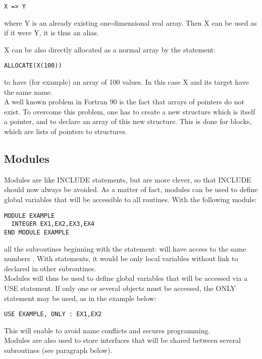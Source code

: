 \begin{lstlisting}[language=TelFortran]
X => Y
\end{lstlisting}
where Y is an already existing one-dimensional real array. Then X can be used as
if it were Y, it is thus an alias.

X can be also directly allocated as a normal array by the statement:
\begin{lstlisting}[language=TelFortran]
ALLOCATE(X(100))
\end{lstlisting}
to have (for example) an array of 100 values. In this case X and its target
have the same name.
\\
A well known problem in Fortran 90 is the fact that arrays of pointers do not
exist. To overcome this problem, one has to create a new structure which is
itself a pointer, and to declare an array of this new structure. This is done
for blocks, which are lists of pointers to  structures.

\subsection{Modules}

Modules are like INCLUDE statements, but are more clever, so that INCLUDE
should now always be avoided. As a matter of fact, modules can be used to
define global variables that will be accessible to all routines. With the
following module:

\begin{lstlisting}[language=TelFortran]
MODULE EXAMPLE
  INTEGER EX1,EX2,EX3,EX4
END MODULE EXAMPLE
\end{lstlisting}
all the subroutines beginning with the statement:  will
have access to the same numbers . With 
statements, it would be only local variables without link to
 declared in other subroutines.
\\
Modules will thus be used to define global variables that will be accessed via
a USE statement. If only one or several objects must be accessed, the ONLY
statement may be used, as in the example below:

\begin{lstlisting}[language=TelFortran]
USE EXAMPLE, ONLY : EX1,EX2
\end{lstlisting}
This will enable to avoid name conflicts and secures programming.
\\
Modules are also used to store interfaces that will be shared between several
subroutines (see paragraph below).

